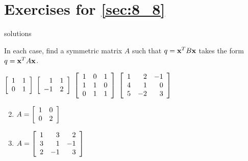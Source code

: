 \section*{Exercises for \ref{sec:8_8}}

\begin{Filesave}{solutions}
\end{Filesave}

\begin{multicols}{2}
\begin{ex}
In each case, find a symmetric matrix $A$ such that $q = \textbf{x}^{T}B\textbf{x}$ takes the form $q = \textbf{x}^{T}A\textbf{x}$.


\begin{exenumerate}
\exitem $\left[ \begin{array}{rr}
1 & 1 \\
0 & 1
\end{array}\right]$
\exitem $\left[ \begin{array}{rr}
1 & 1 \\
-1 & 2
\end{array}\right]$
\exitem $\left[ \begin{array}{rrr}
1 & 0 & 1 \\
1 & 1 & 0 \\
0 & 1 & 1
\end{array}\right]$
\exitem $\left[ \begin{array}{rrr}
1 & 2 & -1 \\
4 & 1 & 0 \\
5 & -2 & 3
\end{array}\right]$
\end{exenumerate}
\begin{sol}
\begin{enumerate}[label={\alph*.}]
\setcounter{enumi}{1}
\item  $A = \left[ \begin{array}{rr}
1 & 0 \\
0 & 2
\end{array}\right]$

\setcounter{enumi}{3}
\item  $A = \left[ \begin{array}{rrr}
1 & 3 & 2 \\
3 & 1 & -1 \\
2 & -1 & 3
\end{array}\right]$

\end{enumerate}
\end{sol}
\end{ex}


\end{multicols}
